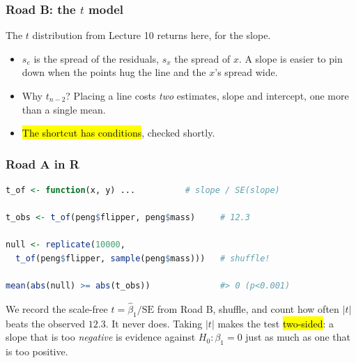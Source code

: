 \documentclass[slidestop,compress,mathserif]{beamer}
\begin{document}
\begin{frame}
\frametitle{Road B: the $t$ model}

The $t$ distribution from Lecture 10 returns here, for the slope.

\vspace{0.2em}

\vspace{0.2em}
{\small
\begin{itemize}\setlength{\itemsep}{1pt}
\item $s_e$ is the spread of the residuals, $s_x$ the spread of $x$. A slope is easier to pin down when the points hug the line and the $x$'s spread wide.
\item Why $t_{n-2}$? Placing a line costs \emph{two} estimates, slope and intercept, one more than a single mean.
\item \hl{The shortcut has conditions}, checked shortly.
\end{itemize}}

\end{frame}


\begin{frame}[fragile]
\frametitle{Road A in R}

\begin{lstlisting}[language=R, basicstyle=\ttfamily\scriptsize]
t_of <- function(x, y) ...          # slope / SE(slope)

t_obs <- t_of(peng$flipper, peng$mass)     # 12.3

null <- replicate(10000,
  t_of(peng$flipper, sample(peng$mass)))   # shuffle!

mean(abs(null) >= abs(t_obs))              #> 0 (p<0.001)
\end{lstlisting}

\vspace{-0.2em}
{\small We record the scale-free $t = \hat\beta_1/\mathrm{SE}$ from Road B, shuffle, and count how often $|t|$ beats the observed $12.3$. It never does. Taking $|t|$ makes the test \hl{two-sided}: a slope that is too \emph{negative} is evidence against $H_0:\beta_1=0$ just as much as one that is too positive.}

\end{frame}
\end{document}
